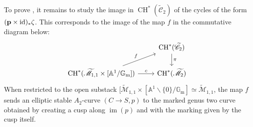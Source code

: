 \documentclass[a4paper, 10pt]{amsart}
\numberwithin{equation}{section}
\numberwithin{subsection}{section}
\theoremstyle{definition}
\theoremstyle{remark}
\renewcommand{\mathcal}{\mathscr}
\renewcommand\AA{\mathbb{A}} \newcommand\BB{\mathbb{B}}
\newcommand\GG{\mathbb{G}} \newcommand\HH{\mathbb{H}}
\newcommand\rmm{\mathrm{m}} \newcommand\rmn{\mathrm{n}}
\newcommand\im[1]{\operatorname{im}(#1)}
\newcommand{\gm}{\GG_{\rmm}}
\newcommand{\Mtilde}{\widetilde{\mathcal M}}
\newcommand{\Ctilde}{\widetilde{\mathcal C}}
\newcommand{\ch}[1][*]{\operatorname{CH}^{#1}}
\begin{document}
	To prove , it remains to study the image in $\ch(\Ctilde_2)$ of the cycles of the form $(\mathbf{p}\times\rm{id})_*\zeta$. This corresponds to the image of the map $f$ in the commutative diagram below:
	\begin{equation*}
		\begin{tikzcd}
			& \ch(\Ctilde_2) \ar[d, "\pi"] \\
			\ch(\Mtilde_{1,1}\times[\AA^1/\gm]) \ar[ur,"f"] \ar[r, "c"] & \ch(\Mtilde_2)
		\end{tikzcd}
	\end{equation*}
	When restricted to the open substack $[\Mtilde_{1,1}\times [\AA^1\smallsetminus\{0\}/\gm]\simeq \Mtilde_{1,1}$, the map $f$ sends an elliptic stable $A_2$-curve $(C\to S,p)$ to the marked genus two curve obtained by creating a cusp along $\im{p}$ and with the marking given by the cusp itself.
	
\end{document}

